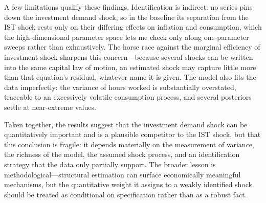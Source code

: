 \documentclass[12pt]{article}
\begin{document}
A few limitations qualify these findings. Identification is indirect: no series pins down the investment demand shock, so in the baseline its separation from the IST shock rests only on their differing effects on inflation and consumption, which the high-dimensional parameter space lets me check only along one-parameter sweeps rather than exhaustively. The horse race against the marginal efficiency of investment shock sharpens this concern---because several shocks can be written into the same capital law of motion, an estimated shock may capture little more than that equation's residual, whatever name it is given. The model also fits the data imperfectly: the variance of hours worked is substantially overstated, traceable to an excessively volatile consumption process, and several posteriors settle at near-extreme values.

Taken together, the results suggest that the investment demand shock can be quantitatively important and is a plausible competitor to the IST shock, but that this conclusion is fragile: it depends materially on the measurement of variance, the richness of the model, the assumed shock process, and an identification strategy that the data only partially support. The broader lesson is methodological---structural estimation can surface economically meaningful mechanisms, but the quantitative weight it assigns to a weakly identified shock should be treated as conditional on specification rather than as a robust fact.
\end{document}
